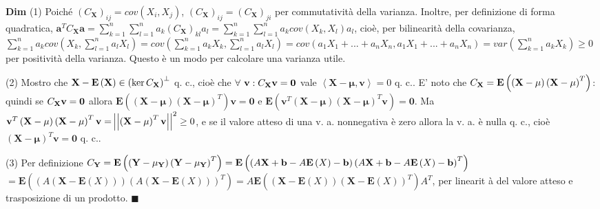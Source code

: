 \documentclass{article}
\begin{document}
\textbf{Dim} (1) Poich\'{e} $\left( C_{\mathbf{X}}\right) _{ij}=cov\left(
X_{i},X_{j}\right) $, $\left( C_{\mathbf{X}}\right) _{ij}=\left( C_{\mathbf{X%
}}\right) _{ji}$ per commutativit\`{a} della varianza. Inoltre, per
definizione di forma quadratica, $\mathbf{a}^{T}C_{\mathbf{X}}\mathbf{a}%
=\sum_{k=1}^{n}\sum_{l=1}^{n}a_{k}\left( C_{\mathbf{X}}\right)
_{kl}a_{l}=\sum_{k=1}^{n}\sum_{l=1}^{n}a_{k}cov\left( X_{k},X_{l}\right)
a_{l}$, cio\`{e}, per bilinearit\`{a} della covarianza, $%
\sum_{k=1}^{n}a_{k}cov\left( X_{k},\sum_{l=1}^{n}a_{l}X_{l}\right)
=cov\left( \sum_{k=1}^{n}a_{k}X_{k},\sum_{l=1}^{n}a_{l}X_{l}\right)
=cov\left( a_{1}X_{1}+...+a_{n}X_{n},a_{1}X_{1}+...+a_{n}X_{n}\right)
=var\left( \sum_{k=1}^{n}a_{k}X_{k}\right) \geq 0$ per positivit\`{a} della
varianza. Questo \`{e} un modo per calcolare una varianza utile.

(2) Mostro che $\mathbf{X-E}\left( \mathbf{X}\right) \in \left( \ker C_{%
\mathbf{X}}\right) ^{\perp }$ q. c., cio\`{e} che $\forall $ $\mathbf{v}:C_{%
\mathbf{X}}\mathbf{v=0}$ vale $\left\langle \mathbf{X-\mu ,v}\right\rangle
=0 $ q. c.. E' noto che $C_{\mathbf{X}}=\mathbf{E}\left( \left( \mathbf{%
X-\mu }\right) \left( \mathbf{X-\mu }\right) ^{T}\right) $: quindi se $C_{%
\mathbf{X}}\mathbf{v=0}$ allora $\mathbf{E}\left( \left( \mathbf{X-\mu }%
\right) \left( \mathbf{X-\mu }\right) ^{T}\right) \mathbf{v=0}$ e $\mathbf{E}%
\left( \mathbf{v}^{T}\left( \mathbf{X-\mu }\right) \left( \mathbf{X-\mu }%
\right) ^{T}\mathbf{v}\right) \mathbf{=0}$. Ma $\mathbf{v}^{T}\left( \mathbf{%
X-\mu }\right) \left( \mathbf{X-\mu }\right) ^{T}\mathbf{v=}\left\vert
\left\vert \left( \mathbf{X-\mu }\right) ^{T}\mathbf{v}\right\vert
\right\vert ^{2}\geq 0$, e se il valore atteso di una v. a. nonnegativa \`{e}
zero allora la v. a. \`{e} nulla q. c., cio\`{e} $\left( \mathbf{X-\mu }%
\right) ^{T}\mathbf{v=0}$ q. c..

(3) Per definizione $C_{\mathbf{Y}}=\mathbf{E}\left( \left( \mathbf{Y}-\mu _{%
\mathbf{Y}}\right) \left( \mathbf{Y}-\mu _{\mathbf{Y}}\right) ^{T}\right) =%
\mathbf{E}\left( \left( A\mathbf{X+b}-A\mathbf{E}\left( X\right) -\mathbf{b}%
\right) \left( A\mathbf{X+b}-A\mathbf{E}\left( X\right) -\mathbf{b}\right)
^{T}\right) $ $=\mathbf{E}\left( \left( A\left( \mathbf{X-E}\left( X\right)
\right) \right) \left( A\left( \mathbf{X-E}\left( X\right) \right) \right)
^{T}\right) =A\mathbf{E}\left( \left( \mathbf{X-E}\left( X\right) \right)
\left( \mathbf{X-E}\left( X\right) \right) ^{T}\right) A^{T}$, per linearit%
\`{a} del valore atteso e trasposizione di un prodotto. $\blacksquare $
\end{document}
